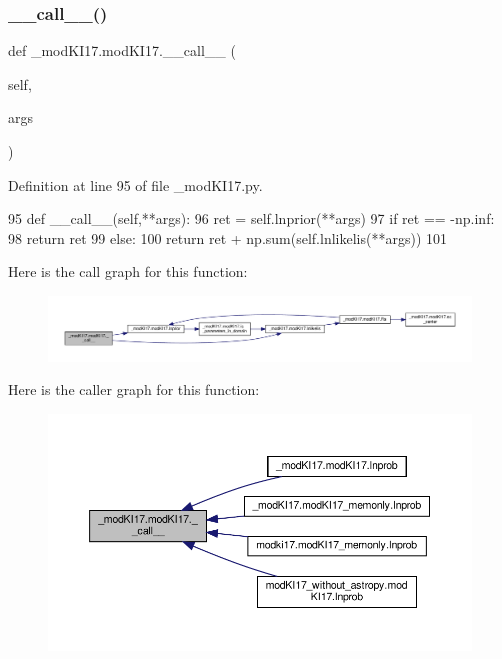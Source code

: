 \subsubsection{\texorpdfstring{\+\_\+\+\_\+call\+\_\+\+\_\+()}{\_\_call\_\_()}}
{\footnotesize\ttfamily def \+\_\+mod\+K\+I17.\+mod\+K\+I17.\+\_\+\+\_\+call\+\_\+\+\_\+ (\begin{DoxyParamCaption}\item[{}]{self,  }\item[{}]{args }\end{DoxyParamCaption})}



Definition at line 95 of file \+\_\+mod\+K\+I17.\+py.


\begin{DoxyCode}
95     \textcolor{keyword}{def }\_\_call\_\_(self,**args):
96         ret = self.lnprior(**args)
97         \textcolor{keywordflow}{if} ret == -np.inf:
98             \textcolor{keywordflow}{return} ret
99         \textcolor{keywordflow}{else}:
100             \textcolor{keywordflow}{return} ret + np.sum(self.lnlikelis(**args)) 
101         
\end{DoxyCode}
Here is the call graph for this function\+:\nopagebreak
\begin{figure}[H]
\begin{center}
\leavevmode
\includegraphics[width=350pt]{d8/d2c/class__modKI17_1_1modKI17_a20bf807508e322e3920b4bac36a8478a_cgraph}
\end{center}
\end{figure}
Here is the caller graph for this function\+:\nopagebreak
\begin{figure}[H]
\begin{center}
\leavevmode
\includegraphics[width=350pt]{d8/d2c/class__modKI17_1_1modKI17_a20bf807508e322e3920b4bac36a8478a_icgraph}
\end{center}
\end{figure}
\mbox{\label{class__modKI17_1_1modKI17_a9df500ff2a922b4ec30f3cfc27b07b6a}} 
